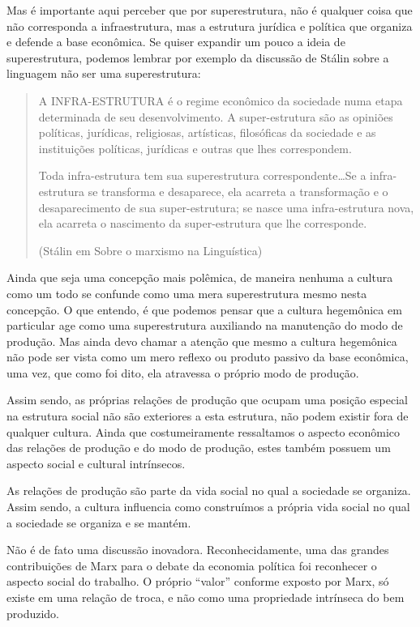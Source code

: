 Mas é importante aqui perceber que por superestrutura, não é qualquer coisa que não corresponda a infraestrutura, mas a estrutura jurídica e política que organiza e defende a base econômica. Se quiser expandir um pouco a ideia de superestrutura, podemos lembrar por exemplo da discussão de Stálin sobre a linguagem não ser uma superestrutura:

\begin{quote}
A INFRA-ESTRUTURA é o regime econômico da sociedade numa etapa determinada de seu desenvolvimento. A super-estrutura são as opiniões políticas, jurídicas, religiosas, artísticas, filosóficas da sociedade e as instituições políticas, jurídicas e outras que lhes correspondem.

Toda infra-estrutura tem sua superestrutura correspondente…Se a infra-estrutura se transforma e desaparece, ela acarreta a transformação e o desaparecimento de sua super-estrutura; se nasce uma infra-estrutura nova, ela acarreta o nascimento da super-estrutura que lhe corresponde.

(Stálin em Sobre o marxismo na Linguística)
\end{quote}
Ainda que seja uma concepção mais polêmica, de maneira nenhuma a cultura como um todo se confunde como uma mera superestrutura mesmo nesta concepção. O que entendo, é que podemos pensar que a cultura hegemônica em particular age como uma superestrutura auxiliando na manutenção do modo de produção. Mas ainda devo chamar a atenção que mesmo a cultura hegemônica não pode ser vista como um mero reflexo ou produto passivo da base econômica, uma vez, que como foi dito, ela atravessa o próprio modo de produção.

Assim sendo, as próprias relações de produção que ocupam uma posição especial na estrutura social não são exteriores a esta estrutura, não podem existir fora de qualquer cultura. Ainda que costumeiramente ressaltamos o aspecto econômico das relações de produção e do modo de produção, estes também possuem um aspecto social e cultural intrínsecos.

As relações de produção são parte da vida social no qual a sociedade se organiza. Assim sendo, a cultura influencia como construímos a própria vida social no qual a sociedade se organiza e se mantém.

Não é de fato uma discussão inovadora. Reconhecidamente, uma das grandes contribuições de Marx para o debate da economia política foi reconhecer o aspecto social do trabalho. O próprio “valor” conforme exposto por Marx, só existe em uma relação de troca, e não como uma propriedade intrínseca do bem produzido.

